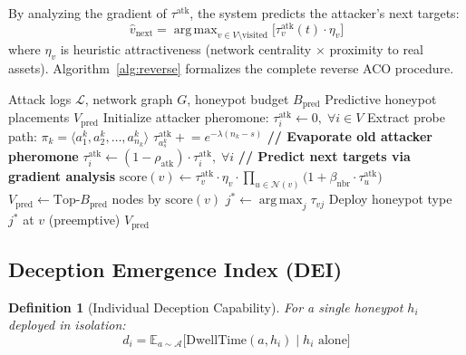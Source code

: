 \documentclass[review,3p,twocolumn]{elsarticle}
\newtheorem{definition}[theorem]{Definition}
\newcommand{\calA}{\mathcal{A}}
\newcommand{\calN}{\mathcal{N}}
\DeclareMathOperator*{\argmax}{arg\,max}
\begin{document}
By analyzing the gradient of $\tau^{\mathrm{atk}}$, the system predicts the attacker's next targets:
\begin{equation}
\label{eq:predict}
\hat{v}_{\mathrm{next}} = \argmax_{v \in V \setminus \mathrm{visited}} \bigl[ \tau^{\mathrm{atk}}_v(t) \cdot \eta_v \bigr]
\end{equation}
where $\eta_v$ is heuristic attractiveness (network centrality $\times$ proximity to real assets). Algorithm~\ref{alg:reverse} formalizes the complete reverse ACO procedure.

\begin{algorithm}[t]
\caption{Reverse Ant Colony Predictive Deployment}
\label{alg:reverse}
\begin{algorithmic}[1]
\REQUIRE Attack logs $\mathcal{L}$, network graph $G$, honeypot budget $B_{\mathrm{pred}}$
\ENSURE Predictive honeypot placements $V_{\mathrm{pred}}$
\STATE Initialize attacker pheromone: $\tau^{\mathrm{atk}}_i \leftarrow 0, \; \forall i \in V$
  \STATE Extract probe path: $\pi_k = \langle a_1^k, a_2^k, \ldots, a_{n_k}^k \rangle$
    \STATE $\tau^{\mathrm{atk}}_{a_s^k} \mathrel{+}= e^{-\lambda(n_k - s)}$
  \ENDFOR
\ENDFOR
\STATE \textbf{// Evaporate old attacker pheromone}
\STATE $\tau^{\mathrm{atk}}_i \leftarrow (1 - \rho_{\mathrm{atk}}) \cdot \tau^{\mathrm{atk}}_i, \; \forall i$
\STATE \textbf{// Predict next targets via gradient analysis}
  \STATE $\mathrm{score}(v) \leftarrow \tau^{\mathrm{atk}}_v \cdot \eta_v \cdot \prod_{u \in \calN(v)} \bigl(1 + \beta_{\mathrm{nbr}} \cdot \tau^{\mathrm{atk}}_u\bigr)$
\ENDFOR
\STATE $V_{\mathrm{pred}} \leftarrow \text{Top-}B_{\mathrm{pred}}$ nodes by $\mathrm{score}(v)$
  \STATE $j^* \leftarrow \argmax_j \tau_{vj}$
  \STATE Deploy honeypot type $j^*$ at $v$ (preemptive)
\ENDFOR
\RETURN $V_{\mathrm{pred}}$
\end{algorithmic}
\end{algorithm}


\subsection{Deception Emergence Index (DEI)}
\label{sec:framework:dei}

\begin{definition}[Individual Deception Capability]
For a single honeypot $h_i$ deployed in isolation:
\begin{equation}
d_i = \mathbb{E}_{a \sim \calA} \bigl[ \mathrm{DwellTime}(a, h_i) \mid h_i \text{ alone} \bigr]
\end{equation}
\end{definition}
\end{document}
